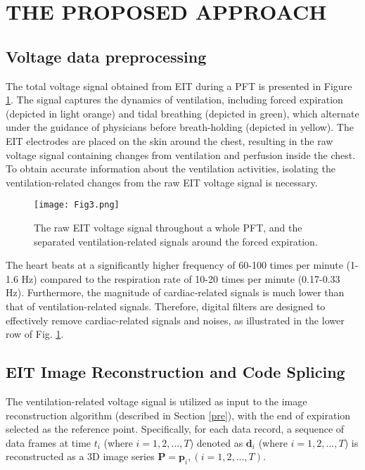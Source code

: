 \documentclass[journal,twoside,web]{ieeecolor}
\begin{document}
\section{THE PROPOSED APPROACH}
\label{method}

\subsection{Voltage data preprocessing}
The total voltage signal obtained from EIT during a PFT is presented in Figure \ref{raw}. The signal captures the dynamics of ventilation, including forced expiration (depicted in light orange) and tidal breathing (depicted in green), which alternate under the guidance of physicians before breath-holding (depicted in yellow). The EIT electrodes are placed on the skin around the chest, resulting in the raw voltage signal containing changes from ventilation and perfusion inside the chest. To obtain accurate information about the ventilation activities, isolating the ventilation-related changes from the raw EIT voltage signal is necessary.

 \begin{figure}[!h] 
	\centering
	\texttt{[image: Fig3.png]}
	\caption{The raw EIT voltage signal throughout a whole PFT, and the separated ventilation-related signals around the forced expiration.}
	\label{raw}
\end{figure}

The heart beats at a significantly higher frequency of 60-100 times per minute (1-1.6 Hz) compared to the respiration rate of 10-20 times per minute (0.17-0.33 Hz). Furthermore, the magnitude of cardiac-related signals is much lower than that of ventilation-related signals. Therefore, digital filters are designed to effectively remove cardiac-related signals and noises, as illustrated in the lower row of Fig. \ref{raw}.

\subsection{EIT Image Reconstruction and Code Splicing}
The ventilation-related voltage signal is utilized as input to the image reconstruction algorithm (described in Section \ref{pre}), with the end of expiration selected as the reference point. Specifically, for each data record, a sequence of data frames at time $t_i$ (where $i=1,2,...,T$) denoted as $\bm d_i$ (where $i=1,2,...,T$) is reconstructed as a 3D image series $\bm P = {\bm p_i, (i=1,2,...,T)}$.
\end{document}
